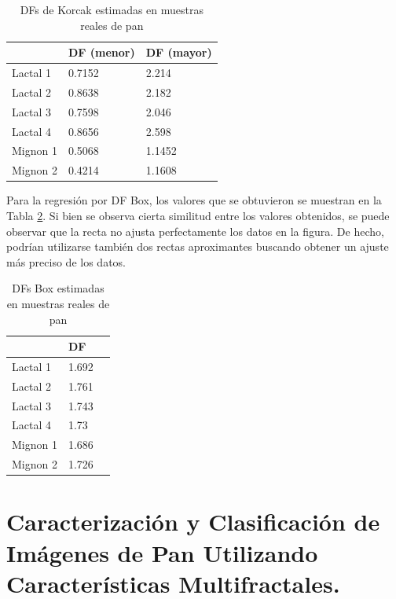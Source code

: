 \begin{table}
\center
\begin{tabular}{|| l | l | l ||}
    \hline
     & DF (menor) & DF (mayor) \\    
    \hline
    Lactal 1 & 0.7152 & 2.214 \\
    \hline
    Lactal 2 & 0.8638 & 2.182 \\
    \hline
    Lactal 3 & 0.7598 & 2.046 \\
    \hline
    Lactal 4 & 0.8656 & 2.598 \\
    \hline
    Mignon 1 & 0.5068 & 1.1452\\
    \hline
    Mignon 2 & 0.4214 & 1.1608\\
    \hline
\end{tabular}
\caption{DFs de Korcak estimadas en muestras reales de pan}
\label{tab:korcak}
\end{table}


Para la regresi\'on por DF Box, los valores que se obtuvieron se muestran en la Tabla \ref{tab:box}.
Si bien se observa cierta similitud entre los valores obtenidos, se puede observar que la recta no ajusta perfectamente los datos en la figura.
De hecho, podrían utilizarse también dos rectas aproximantes buscando obtener un ajuste más preciso de los datos.

\begin{table}
\begin{center}
\begin{tabular}{|| l | l | l ||}
    \hline
     & DF \\    
    \hline
    Lactal 1 & 1.692 \\
    \hline
    Lactal 2 & 1.761 \\
    \hline
    Lactal 3 & 1.743\\
    \hline
    Lactal 4 & 1.73 \\
    \hline
    Mignon 1 & 1.686 \\
    \hline
    Mignon 2 & 1.726 \\
    \hline
\end{tabular}
\caption{DFs Box estimadas en muestras reales de pan}
\label{tab:box}
\end{center}
\end{table}

\section[Características Multifractales del pan]{Caracterización y Clasificación de Imágenes de Pan Utilizando Características Multifractales.}

